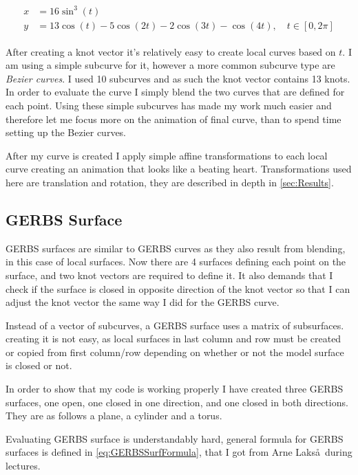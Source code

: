 \documentclass[a4paper,12pt]{extarticle}
\begin{document}
\begin{align}
\begin{split}
x &= 16 \sin^3(t) \\
y &= 13 \cos(t) - 5 \cos(2t) - 2 \cos(3t) - \cos(4t), \quad t \in [0,2\pi]
\label{eq:HeartCurve}
\end{split}
\end{align}

After creating a knot vector it's relatively easy to create local curves based on $t$. I am using a simple subcurve for it, however a more common subcurve type are \emph{Bezier curves}. I used 10 subcurves and as such the knot vector contains 13 knots. In order to evaluate the curve I simply blend the two curves that are defined for each point. Using these simple subcurves has made my work much easier and therefore let me focus more on the animation of final curve, than to spend time setting up the Bezier curves.

After my curve is created I apply simple affine transformations to each local curve creating an animation that looks like a beating heart. Transformations used here are translation and rotation, they are described in depth in \cref{sec:Results}.

\subsection{GERBS Surface}
GERBS surfaces are similar to GERBS curves as they also result from blending, in this case of local surfaces. Now there are 4 surfaces defining each point on the surface, and two knot vectors are required to define it. It also demands that I check if the surface is closed in opposite direction of the knot vector so that I can adjust the knot vector the same way I did for the GERBS curve. 

Instead of a vector of subcurves, a GERBS surface uses a matrix of subsurfaces. creating it is not easy, as local surfaces in last column and row must be created or copied from first column/row depending on whether or not the model surface is closed or not.

In order to show that my code is working properly I have created three GERBS surfaces, one open, one closed in one direction, and one closed in both directions. They are as follows a plane, a cylinder and a torus.

Evaluating GERBS surface is understandably hard, general formula for GERBS surfaces is defined in \cref{eq:GERBSSurfFormula}, that I got from Arne Laks\aa\, during lectures.
\end{document}
